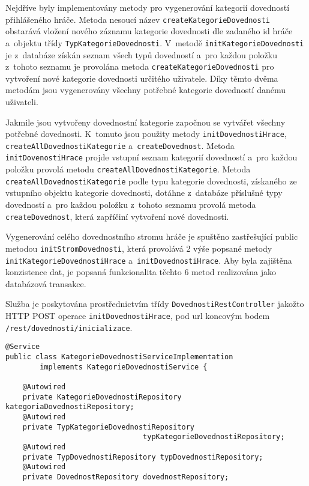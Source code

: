 \documentclass[12pt]{article}
\begin{document}
{Nejdříve byly implementovány metody pro vygenerování kategorií dovedností přihlášeného hráče. Metoda nesoucí název \texttt{createKategorieDovednosti} obstarává vložení nového záznamu kategorie dovednosti dle zadaného id hráče a~objektu třídy \texttt{TypKategorieDovednosti}.
V~metodě \texttt{initKategorieDovednosti} je z~databáze získán seznam všech typů dovedností a~pro každou položku z~tohoto seznamu je provolána metoda \texttt{createKategorieDovednosti} pro vytvoření nové kategorie dovednosti určitého uživatele. Díky těmto dvěma metodám jsou vygenerovány všechny potřebné kategorie dovedností danému uživateli. 

Jakmile jsou vytvořeny dovednostní kategorie započnou se vytvářet všechny potřebné dovednosti. K~tomuto jsou použity metody \texttt{initDovednostiHrace}, \texttt{createAllDovednostiKategorie} a~\texttt{createDovednost}. Metoda \texttt{initDovenostiHrace} projde vstupní seznam kategorií dovedností a~pro každou položku provolá metodu \texttt{createAllDovednostiKategorie}. Metoda \texttt{createAllDovednostiKategorie}  podle typu kategorie dovednosti, získaného ze vstupního objektu kategorie dovednosti, dotáhne z~databáze příslušné typy dovedností a~pro každou položku z~tohoto seznamu provolá metoda \texttt{createDovednost}, která zapříčiní vytvoření nové dovednosti. 

Vygenerování celého dovednostního stromu hráče je spuštěno zastřešující public metodou \texttt{initStromDovednosti}, která provolává 2 výše popsané metody \texttt{initKategorieDovednostiHrace} a~\texttt{initDovednostiHrace}. Aby byla zajištěna konzistence dat, je popsaná funkcionalita těchto 6 metod realizována jako databázová transakce. 

Služba je poskytována prostřednictvím třídy \texttt{DovednostiRestController} jakožto HTTP POST operace \texttt{initDovednostiHrace}, pod url koncovým bodem \texttt{/rest/dovednosti/inicializace}.

\begin{lstlisting}
@Service
public class KategorieDovednostiServiceImplementation 
        implements KategorieDovednostiService {
        
    @Autowired
    private KategorieDovednostiRepository kategoriaDovednostiRepository;
    @Autowired
    private TypKategorieDovednostiRepository 
                                typKategorieDovednostiRepository;
    @Autowired
    private TypDovednostiRepository typDovednostiRepository;
    @Autowired
    private DovednostRepository dovednostRepository;
    

\end{lstlisting}}
\end{document}
